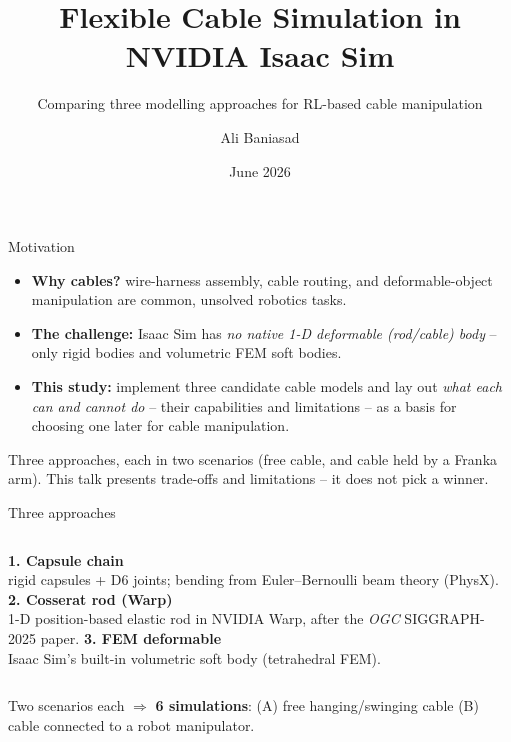 \documentclass[aspectratio=169]{beamer}
\title[Cable Simulation in Isaac Sim]{Flexible Cable Simulation in NVIDIA Isaac Sim}
\subtitle{Comparing three modelling approaches for RL-based cable manipulation}
\author[A. Baniasad]{Ali Baniasad}
\institute[U. Waterloo]{Supervisor: Prof.\ Soo Jeon \\ University of Waterloo}
\date{June 2026}
\begin{document}
\begin{frame}[plain]\titlepage\end{frame}

\begin{frame}{Motivation}
  \begin{itemize}
    \item \textbf{Why cables?} wire-harness assembly, cable routing, and
          deformable-object manipulation are common, unsolved robotics tasks.
    \item \textbf{The challenge:} Isaac Sim has \emph{no native 1-D deformable
          (rod/cable) body} -- only rigid bodies and volumetric FEM soft bodies.
    \item \textbf{This study:} implement three candidate cable models and lay out
          \emph{what each can and cannot do} -- their capabilities and limitations --
          as a basis for choosing one later for cable manipulation.
  \end{itemize}
  \vfill
  {\footnotesize Three approaches, each in two scenarios (free cable, and cable held
   by a Franka arm). This talk presents trade-offs and limitations -- it does not pick a winner.}
\end{frame}

\begin{frame}{Three approaches}
  \begin{columns}[t]
    \centering
      \textbf{1. Capsule chain}\\\smallskip
      {\footnotesize rigid capsules + D6 joints; bending from Euler--Bernoulli
       beam theory (PhysX).}
    \centering
      \textbf{2. Cosserat rod (Warp)}\\\smallskip
      {\footnotesize 1-D position-based elastic rod in NVIDIA Warp, after the
       \emph{OGC} SIGGRAPH-2025 paper.}
    \centering
      \textbf{3. FEM deformable}\\\smallskip
      {\footnotesize Isaac Sim's built-in volumetric soft body (tetrahedral FEM).}
  \end{columns}
  \vfill
  \begin{center}\footnotesize
  Two scenarios each $\Rightarrow$ \textbf{6 simulations}:
  (A) free hanging/swinging cable \quad (B) cable connected to a robot manipulator.
  \end{center}
\end{frame}
\end{document}
